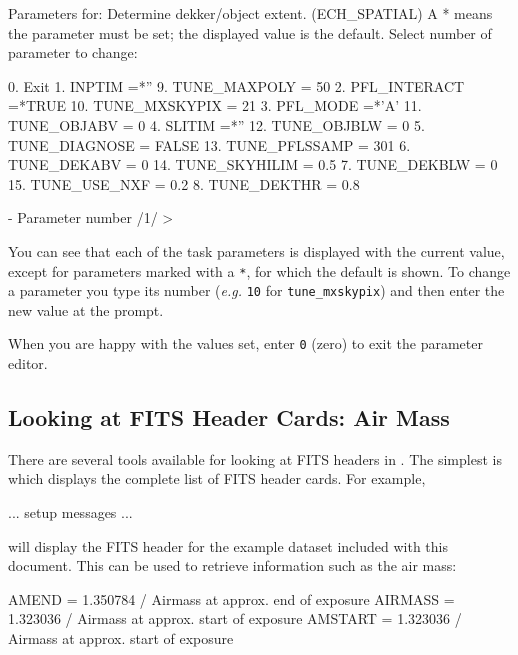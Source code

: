 \documentclass[twoside,11pt]{starlink}
\providecommand{\mlabel}[1]{\xlabel{#1}\label{#1}}
\providecommand{\scspec}[2]{#1}
\begin{document}
{
\scspec{\small}{ }
\begin{terminalv}
    Parameters for: Determine dekker/object extent. (ECH_SPATIAL)
    A * means the parameter must be set; the displayed value is the default.
    Select number of parameter to change:

     0. Exit
     1. INPTIM          =*''            9. TUNE_MAXPOLY    = 50
     2. PFL_INTERACT    =*TRUE         10. TUNE_MXSKYPIX   = 21
     3. PFL_MODE        =*'A'          11. TUNE_OBJABV     = 0
     4. SLITIM          =*''           12. TUNE_OBJBLW     = 0
     5. TUNE_DIAGNOSE   = FALSE        13. TUNE_PFLSSAMP   = 301
     6. TUNE_DEKABV     = 0            14. TUNE_SKYHILIM   = 0.5
     7. TUNE_DEKBLW     = 0            15. TUNE_USE_NXF    = 0.2
     8. TUNE_DEKTHR     = 0.8

    - Parameter number /1/ >
\end{terminalv}
}

You can see that each of the task parameters is displayed with the current
value, except for parameters marked with a \verb+*+, for which the default
is shown.  To change a parameter you type its number ({\it{e.g.}} \verb+10+
for \verb+tune_mxskypix+) and then enter the new value at the prompt.

When you are happy with the values set, enter \verb+0+ (zero) to exit the
parameter editor.


\subsection{\mlabel{cook_airmass}Looking at FITS Header Cards: Air Mass}

There are several tools available for looking at FITS headers in
.
The simplest is  which displays
the complete list of FITS header cards.  For example,

{
\scspec{\small}{ }
\begin{terminalv}
   ... setup messages ...
\end{terminalv}
}

will display the FITS header for the example dataset included with this
document.  This can be used to retrieve information such as the air mass:

{
\scspec{\small}{ }
\begin{terminalv}
   AMEND   =             1.350784 / Airmass at approx. end of exposure
   AIRMASS =             1.323036 / Airmass at approx. start of exposure
   AMSTART =             1.323036 / Airmass at approx. start of exposure
\end{terminalv}
}
\end{document}
